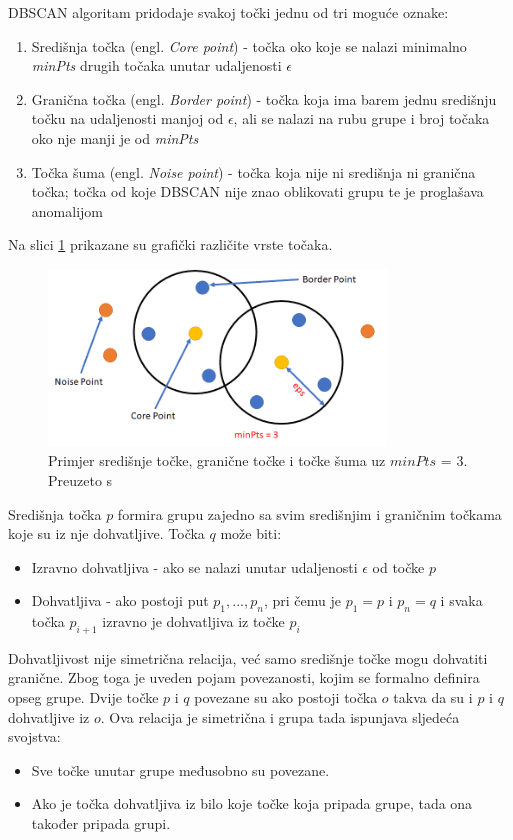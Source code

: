\documentclass[utf8, diplomski, numeric]{fer}
\begin{document}
DBSCAN algoritam pridodaje svakoj točki jednu od tri moguće oznake:
\begin{enumerate}
\item Središnja točka (engl. \textit{Core point}) - točka oko koje se nalazi minimalno \textit{minPts} drugih točaka unutar udaljenosti $\epsilon$
\item Granična točka (engl. \textit{Border point}) - točka koja ima barem jednu središnju točku na udaljenosti manjoj od $\epsilon$, ali se nalazi na rubu grupe i broj točaka oko nje manji je od \textit{minPts} 
\item Točka šuma (engl. \textit{Noise point}) - točka koja nije ni središnja ni granična točka; točka od koje DBSCAN nije znao oblikovati grupu te je proglašava anomalijom
\end{enumerate}

Na slici \ref{fig:dbscan-points} prikazane su grafički različite vrste točaka.

\begin{figure}[htb]
\includegraphics[width=0.8\textwidth]{images/dbscan-points.png}
\centering
\caption{Primjer središnje točke, granične točke i točke šuma uz $minPts$ = 3. Preuzeto s  \cite{DBSCANClustering}}
\label{fig:dbscan-points}
\end{figure}

Središnja točka $p$ formira grupu zajedno sa svim središnjim i graničnim točkama koje su iz nje dohvatljive. Točka $q$ može biti:
\begin{itemize}
\item Izravno dohvatljiva - ako se nalazi unutar udaljenosti $\epsilon$ od točke $p$
\item Dohvatljiva - ako postoji put $p_1, ..., p_n$, pri čemu je $p_1 = p$ i $p_n = q$ i svaka točka $p_{i+1}$ izravno je dohvatljiva iz točke $p_i$
\end{itemize}

Dohvatljivost nije simetrična relacija, već samo središnje točke mogu dohvatiti granične. Zbog toga je uveden pojam povezanosti, kojim se formalno definira opseg grupe. Dvije točke $p$ i $q$ povezane su ako postoji točka $o$ takva da su i $p$ i $q$ dohvatljive iz $o$. Ova relacija je simetrična i grupa tada ispunjava sljedeća svojstva:
\begin{itemize}
\item Sve točke unutar grupe međusobno su povezane.
\item Ako je točka dohvatljiva iz bilo koje točke koja pripada grupe, tada ona također pripada grupi.
\end{itemize}
\end{document}
